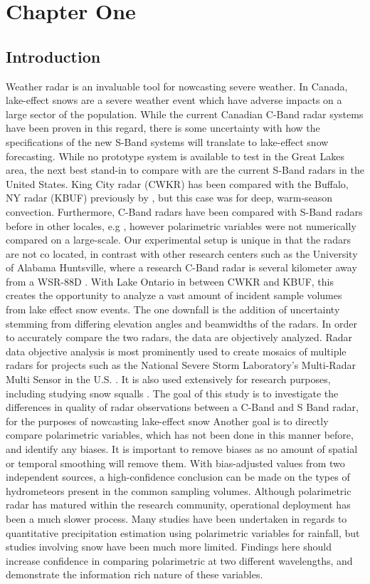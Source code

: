 \chapter{Chapter One}
\section{Introduction}
Weather radar is an invaluable tool for nowcasting severe weather. In Canada, lake-effect snows are a
severe weather event which have adverse impacts on a large
sector of the population. While the current Canadian C-Band radar systems have been proven in this
regard, there is some uncertainty with how the specifications of the new S-Band systems will translate to lake-effect snow forecasting. While no prototype
system is available to test in the Great Lakes area, the next best stand-in to compare with are the current
S-Band
radars in the United States. King City radar (CWKR) has been compared with the Buffalo, NY radar (KBUF)
previously by \cite{Boodoo2015}, but this case was for deep, warm-season convection. Furthermore, C-Band radars have been compared with S-Band radars before
in other locales, e.g \citep{Abon2014,
WMO2008}, however polarimetric variables were not numerically compared on a large-scale. Our experimental setup is unique in that the radars are not co
located, in contrast with other research centers such as the University of Alabama
Huntsville, where a research C-Band radar is several kilometer away from a WSR-88D
\citep{Petersen2007}. With Lake Ontario in between CWKR and KBUF, this creates the opportunity to analyze a vast amount of incident sample volumes from lake
effect snow events. The one downfall is the addition of uncertainty stemming from differing elevation angles and beamwidths of the radars. In order to
accurately compare the two
radars, the data are objectively analyzed. Radar data objective analysis is most prominently used to
create mosaics of multiple radars for projects such as the National Severe Storm Laboratory's Multi-Radar Multi
Sensor in the U.S. \citep{Zhang2016}. It is also used extensively for research purposes, including studying
snow squalls \citep{Mulholland2017}.  The goal of this study is to investigate the differences in quality of radar observations between a C-Band and S
Band radar, for the purposes of
nowcasting lake-effect snow  Another goal is to directly compare polarimetric variables,
which has not been done in this manner before, and
identify any biases. It is important to remove biases as no amount of spatial or temporal smoothing will
remove them. With bias-adjusted values from two independent sources, a high-confidence conclusion can
be made on the types of hydrometeors present in the common sampling volumes. Although polarimetric radar has matured within the research community, operational deployment has been a much
slower process. Many studies have been undertaken in regards to quantitative precipitation estimation
using polarimetric variables for rainfall, but studies involving snow have been much more limited. Findings here
should increase confidence in comparing polarimetric at two different wavelengths, and demonstrate
the information rich nature of these variables. 
